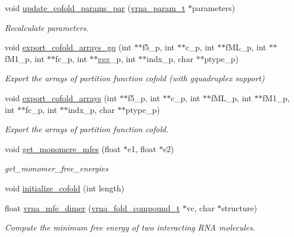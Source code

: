 \begin{DoxyCompactItemize}
void \mbox{\hyperlink{group__mfe__cofold_gaaadbd28b4e428710529ab4098fdacad3}{update\+\_\+cofold\+\_\+params\+\_\+par}} (\mbox{\hyperlink{group__energy__parameters_ga8a69ca7d787e4fd6079914f5343a1f35}{vrna\+\_\+param\+\_\+t}} $\ast$parameters)
\begin{DoxyCompactList}\small\item\em Recalculate parameters. \end{DoxyCompactList}\item 
void \mbox{\hyperlink{group__mfe__cofold_ga5f5bf4df35d0554f6ace9579f8744c48}{export\+\_\+cofold\+\_\+arrays\+\_\+gq}} (int $\ast$$\ast$f5\+\_\+p, int $\ast$$\ast$c\+\_\+p, int $\ast$$\ast$f\+M\+L\+\_\+p, int $\ast$$\ast$f\+M1\+\_\+p, int $\ast$$\ast$fc\+\_\+p, int $\ast$$\ast$ggg\+\_\+p, int $\ast$$\ast$indx\+\_\+p, char $\ast$$\ast$ptype\+\_\+p)
\begin{DoxyCompactList}\small\item\em Export the arrays of partition function cofold (with gquadruplex support) \end{DoxyCompactList}\item 
void \mbox{\hyperlink{group__mfe__cofold_ga5cb6b59983f1f74ccc00b9b9c4e84482}{export\+\_\+cofold\+\_\+arrays}} (int $\ast$$\ast$f5\+\_\+p, int $\ast$$\ast$c\+\_\+p, int $\ast$$\ast$f\+M\+L\+\_\+p, int $\ast$$\ast$f\+M1\+\_\+p, int $\ast$$\ast$fc\+\_\+p, int $\ast$$\ast$indx\+\_\+p, char $\ast$$\ast$ptype\+\_\+p)
\begin{DoxyCompactList}\small\item\em Export the arrays of partition function cofold. \end{DoxyCompactList}\item 
void \mbox{\hyperlink{group__mfe__cofold_ga4958b517c613e4d2afd5bce6c1060a79}{get\+\_\+monomere\+\_\+mfes}} (float $\ast$e1, float $\ast$e2)
\begin{DoxyCompactList}\small\item\em get\+\_\+monomer\+\_\+free\+\_\+energies \end{DoxyCompactList}\item 
void \mbox{\hyperlink{group__mfe__cofold_gafee0c32208aa2ac97338b6e3fbad7fa5}{initialize\+\_\+cofold}} (int length)
\item 
float \mbox{\hyperlink{group__mfe__cofold_gaab22d10c1190f205f16a77cab9d5d3ee}{vrna\+\_\+mfe\+\_\+dimer}} (\mbox{\hyperlink{group__fold__compound_ga1b0cef17fd40466cef5968eaeeff6166}{vrna\+\_\+fold\+\_\+compound\+\_\+t}} $\ast$vc, char $\ast$structure)
\begin{DoxyCompactList}\small\item\em Compute the minimum free energy of two interacting R\+NA molecules. \end{DoxyCompactList}\end{DoxyCompactItemize}



